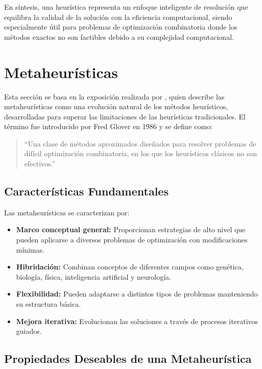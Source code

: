 \documentclass[12pt,titlepage,twoside,openright]{book}
\begin{document}
En síntesis, una heurística representa un enfoque inteligente de resolución que equilibra la calidad de la solución con la eficiencia computacional, siendo especialmente útil para problemas de optimización combinatoria donde los métodos exactos no son factibles debido a su complejidad computacional.

\section{Metaheurísticas}

Esta sección se basa en la exposición realizada por \citep{antonioSuarez2014}, quien describe las metaheurísticas como una evolución natural de los métodos heurísticos, desarrolladas para superar las limitaciones de las heurísticas tradicionales. El término fue introducido por Fred Glover en 1986 y se define como:

\begin{quote}
    ``Una clase de métodos aproximados diseñados para resolver problemas de difícil optimización combinatoria, en los que los heurísticos clásicos no son efectivos.''
\end{quote}

\subsection*{Características Fundamentales}

Las metaheurísticas se caracterizan por:

\begin{itemize}
    \item \textbf{Marco conceptual general:} Proporcionan estrategias de alto nivel que pueden aplicarse a diversos problemas de optimización con modificaciones mínimas.
    \item \textbf{Hibridación:} Combinan conceptos de diferentes campos como genética, biología, física, inteligencia artificial y neurología.
    \item \textbf{Flexibilidad:} Pueden adaptarse a distintos tipos de problemas manteniendo su estructura básica.
    \item \textbf{Mejora iterativa:} Evolucionan las soluciones a través de procesos iterativos guiados.
\end{itemize}

\subsection*{Propiedades Deseables de una Metaheurística}
\end{document}
